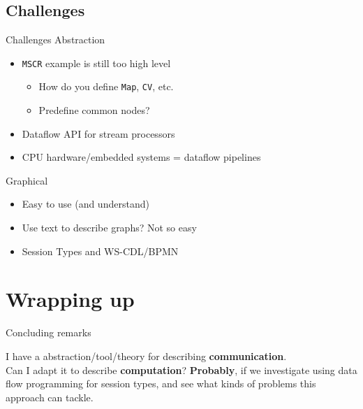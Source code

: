 \documentclass[xcolor={dvipsnames}]{beamer}
\begin{document}
\subsection{Challenges}

\begin{frame}{Challenges}
  Abstraction
  \begin{itemize}
    \item \texttt{MSCR} example is still too high level
      \begin{itemize}
        \item How do you define \texttt{Map}, \texttt{CV}, etc.
        \item Predefine common nodes?
      \end{itemize}
    \item Dataflow API for stream processors
    \item CPU hardware/embedded systems = dataflow pipelines
  \end{itemize}
  Graphical
  \begin{itemize}
    \item Easy to use (and understand)
    \item Use text to describe graphs? Not so easy
    \item Session Types and WS-CDL/BPMN
  \end{itemize}

\end{frame}

\section{Wrapping up}

\begin{frame}{Concluding remarks}
  \begin{center}
  {\Large I have a abstraction/tool/theory for describing
    \textbf{communication}.\\
    Can I adapt it to describe \textbf{computation}?}
    \vfill
    \textbf{Probably}, if we investigate using data flow programming for session
    types, and see what kinds of problems this approach can tackle.
    \vfill
  \end{center}
\end{frame}

\begin{frame}{}
\end{frame}
\end{document}
